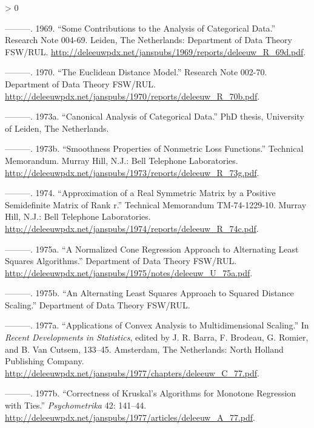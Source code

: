 \documentclass[
  12pt,
]{book}
\newlength{\cslhangindent}
\newenvironment{CSLReferences}[2] %
 {%
  \setlength{\parindent}{0pt}
  \ifodd #1 \everypar{\setlength{\hangindent}{\cslhangindent}}\ignorespaces\fi
  \ifnum #2 > 0
  \setlength{\parskip}{#2\baselineskip}
  \fi
 }%
 {}
\theoremstyle{definition}
\theoremstyle{definition}
\theoremstyle{definition}
\theoremstyle{definition}
\theoremstyle{remark}
\begin{document}
\begin{CSLReferences}{1}{0}
\leavevmode\hypertarget{ref-deleeuw_R_69d}{}%
---------. 1969. {``{Some Contributions to the Analysis of Categorical Data}.''} Research Note 004-69. Leiden, The Netherlands: Department of Data Theory FSW/RUL. \url{http://deleeuwpdx.net/janspubs/1969/reports/deleeuw_R_69d.pdf}.

\leavevmode\hypertarget{ref-deleeuw_R_70b}{}%
---------. 1970. {``{The Euclidean Distance Model}.''} Research Note 002-70. Department of Data Theory FSW/RUL. \url{http://deleeuwpdx.net/janspubs/1970/reports/deleeuw_R_70b.pdf}.

\leavevmode\hypertarget{ref-deleeuw_B_73}{}%
---------. 1973a. {``Canonical Analysis of Categorical Data.''} PhD thesis, University of Leiden, The Netherlands.

\leavevmode\hypertarget{ref-deleeuw_R_73g}{}%
---------. 1973b. {``{Smoothness Properties of Nonmetric Loss Functions}.''} Technical Memorandum. Murray Hill, N.J.: Bell Telephone Laboratories. \url{http://deleeuwpdx.net/janspubs/1973/reports/deleeuw_R_73g.pdf}.

\leavevmode\hypertarget{ref-deleeuw_R_74c}{}%
---------. 1974. {``Approximation of a Real Symmetric Matrix by a Positive Semidefinite Matrix of Rank r.''} Technical Memorandum TM-74-1229-10. Murray Hill, N.J.: Bell Telephone Laboratories. \url{http://deleeuwpdx.net/janspubs/1974/reports/deleeuw_R_74c.pdf}.

\leavevmode\hypertarget{ref-deleeuw_U_75a}{}%
---------. 1975a. {``{A Normalized Cone Regression Approach to Alternating Least Squares Algorithms}.''} Department of Data Theory FSW/RUL. \url{http://deleeuwpdx.net/janspubs/1975/notes/deleeuw_U_75a.pdf}.

\leavevmode\hypertarget{ref-deleeuw_U_75b}{}%
---------. 1975b. {``{An Alternating Least Squares Approach to Squared Distance Scaling}.''} Department of Data Theory FSW/RUL.

\leavevmode\hypertarget{ref-deleeuw_C_77}{}%
---------. 1977a. {``Applications of Convex Analysis to Multidimensional Scaling.''} In \emph{Recent Developments in Statistics}, edited by J. R. Barra, F. Brodeau, G. Romier, and B. Van Cutsem, 133--45. Amsterdam, The Netherlands: North Holland Publishing Company. \url{http://deleeuwpdx.net/janspubs/1977/chapters/deleeuw_C_77.pdf}.

\leavevmode\hypertarget{ref-deleeuw_A_77}{}%
---------. 1977b. {``Correctness of Kruskal's Algorithms for Monotone Regression with Ties.''} \emph{Psychometrika} 42: 141--44. \url{http://deleeuwpdx.net/janspubs/1977/articles/deleeuw_A_77.pdf}.


\end{CSLReferences}
\end{document}
